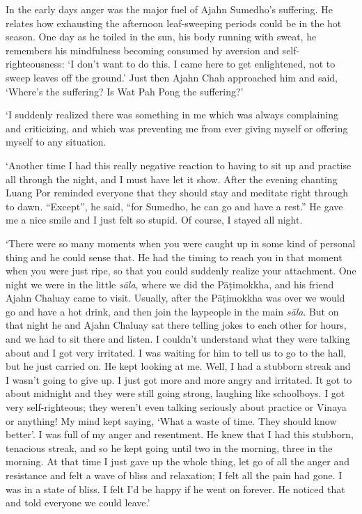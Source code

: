 In the early days anger was the major fuel of Ajahn Sumedho's suffering. 
He relates how exhausting the afternoon leaf-sweeping periods could be
in the hot season. One day as he toiled in the sun, his body running
with sweat, he remembers his mindfulness becoming consumed by aversion
and self-righteousness: `I don't want to do this. I came here to get
enlightened, not to sweep leaves off the ground.' Just then Ajahn Chah
approached him and said, `Where's the suffering? Is Wat Pah Pong the
suffering?'

`I suddenly realized there was something in me which was always
complaining and criticizing, and which was preventing me from ever
giving myself or offering myself to any situation. 

`Another time I had this really negative reaction to having to sit up
and practise all through the night, and I must have let it show. After
the evening chanting Luang Por reminded everyone that they should stay
and meditate right through to dawn. ``Except'', he said, ``for Sumedho, 
he can go and have a rest.'' He gave me a nice smile and I just felt so
stupid. Of course, I stayed all night. 

`There were so many moments when you were caught up in some kind of
personal thing and he could sense that. He had the timing to reach you
in that moment when you were just ripe, so that you could suddenly
realize your attachment. One night we were in the little \emph{sāla}, 
where we did the Pāṭimokkha, and his friend Ajahn Chaluay came to visit. 
Usually, after the Pāṭimokkha was over we would go and have a hot drink, 
and then join the laypeople in the main \emph{sāla}. But on that night
he and Ajahn Chaluay sat there telling jokes to each other for hours, 
and we had to sit there and listen. I couldn't understand what they were
talking about and I got very irritated. I was waiting for him to tell us
to go to the hall, but he just carried on. He kept looking at me. Well, 
I had a stubborn streak and I wasn't going to give up. I just got more
and more angry and irritated. It got to about midnight and they were
still going strong, laughing like schoolboys. I got very self-righteous; 
they weren't even talking seriously about practice or Vinaya or
anything! My mind kept saying, `What a waste of time. They should know
better'. I was full of my anger and resentment. He knew that I had this
stubborn, tenacious streak, and so he kept going until two in the
morning, three in the morning. At that time I just gave up the whole
thing, let go of all the anger and resistance and felt a wave of bliss
and relaxation; I felt all the pain had gone. I was in a state of bliss. 
I felt I'd be happy if he went on forever. He noticed that and told
everyone we could leave.'

